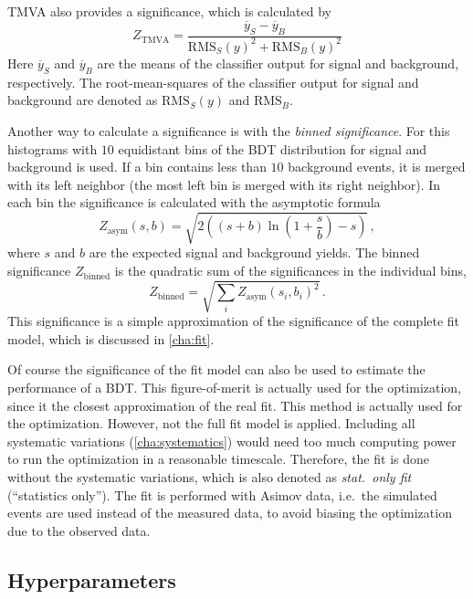 TMVA also provides a significance, which is calculated by
\begin{equation}
    Z_\text{TMVA} = \frac{\overline{y}_S - \overline{y}_B}{{\text{RMS}_S(y)}^2 + {\text{RMS}_B(y)}^2}
\end{equation}
Here $\overline{y}_{S}$ and $\overline{y}_{B}$ are the means of the classifier output for signal and background, respectively.
The root-mean-squares of the classifier output for signal and background are denoted as $\text{RMS}_S(y)$ and $\text{RMS}_B$.

Another way to calculate a significance is with the \emph{binned significance}.
For this histograms with $10$ equidistant bins of the BDT distribution for signal and background is used.
If a bin contains less than $10$ background events, it is merged with its left neighbor (the most left bin is merged
with its right neighbor).
In each bin the significance is calculated with the asymptotic formula~\cite{CowanAsymSig}
\begin{equation}
    Z_\text{asym}(s, b) = \sqrt{2 \left( (s+b) \ln \left(1 + \frac{s}{b} \right) - s \right)} \,,
\end{equation}
where $s$ and $b$ are the expected signal and background yields.
The binned significance $Z_\text{binned}$ is the quadratic sum of the significances in the individual bins,
\begin{equation}
    Z_\text{binned} = \sqrt{\sum_i {Z_\text{asym}(s_i, b_i)}^2} \,.
\end{equation}
This significance is a simple approximation of the significance of the complete fit model, which is discussed in \cref{cha:fit}.

Of course the significance of the fit model can also be used to estimate the performance of a BDT\@.
This figure-of-merit is actually used for the optimization, since it the closest approximation of the real fit.
This method is actually used for the optimization.
However, not the full fit model is applied.
Including all systematic variations (\cref{cha:systematics}) would need too much computing power to run the optimization in a reasonable timescale.
Therefore, the fit is done without the systematic variations, which is also denoted as \emph{stat.\ only fit} (``statistics only'').
The fit is performed with Asimov data, i.e.\ the simulated events are used instead of the measured data, to avoid biasing the optimization due to the observed data.

\subsection{Hyperparameters}\label{sub:mva:hyperparameters}

